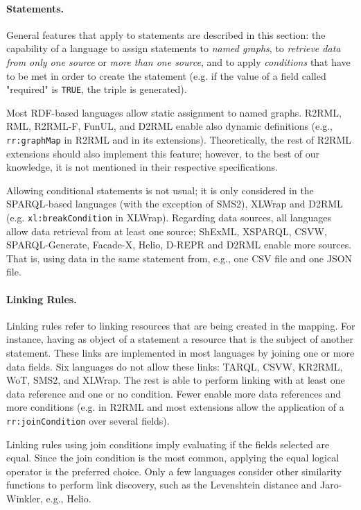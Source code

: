 \noindent\paragraph{\textbf{Statements.}} General features that apply to statements are described in this section: the capability of a language to assign statements to \textit{named graphs}, to \textit{retrieve data from only one source} or \textit{more than one source}, and to apply \textit{conditions} that have to be met in order to create the statement (e.g. if the value of a field called "required" is \texttt{TRUE}, the triple is generated).

Most RDF-based languages allow static assignment to named graphs. R2RML, RML, R2RML-F, FunUL, and D2RML enable also dynamic definitions (e.g., \texttt{rr:graph\-Map} in R2RML and in its extensions). Theoretically, the rest of R2RML extensions should also implement this feature; however, to the best of our knowledge, it is not mentioned in their respective specifications. 

Allowing conditional statements is not usual; it is only considered in the SPARQL-based languages (with the exception of SMS2), XLWrap and D2RML (e.g. \texttt{xl:breakCo\-ndition} in XLWrap). Regarding data sources, all languages allow data retrieval from at least one source; ShExML, XSPARQL, CSVW, SPARQL-Generate, Facade-X, Helio, D-REPR and D2RML enable more sources. That is, using data in the same statement from, e.g., one CSV file and one JSON file.


\noindent\paragraph{\textbf{Linking Rules.}} Linking rules refer to linking resources that are being created in the mapping. For instance, having as object of a statement a resource that is the subject of another statement. These links are implemented in most languages by joining one or more data fields. Six languages do not allow these links: TARQL, CSVW, KR2RML, WoT, SMS2, and XLWrap. The rest is able to perform linking with at least one data reference and one or no condition. Fewer enable more data references and more conditions (e.g. in R2RML and most extensions allow the application of a \texttt{rr:joinCondition} over several fields). 

Linking rules using join conditions imply evaluating if the fields selected are equal. Since the join condition is the most common, applying the equal logical operator is the preferred choice. Only a few languages consider other similarity functions to perform link discovery, such as the Levenshtein distance and Jaro-Winkler, e.g., Helio. %





